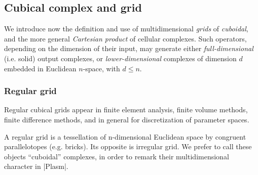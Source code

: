 \subsection{Cubical complex and grid}\label{sect:3-2-2}


We introduce now the definition and use of multidimensional \emph{grids} of \emph{cuboidal}, and the more general \emph{Cartesian product} of cellular complexes. Such operators, depending on the dimension of their input, may generate either \emph{full-dimensional} (i.e. solid) output complexes, or \emph{lower-dimensional} complexes of dimension $d$ embedded in Euclidean $n$-space, with $d\leq n$.  

\subsubsection*{Regular grid}


Regular cubical grids appear in finite element analysis, finite volume methods, finite difference methods, and in general for discretization of parameter spaces. 

\begin{definition} A regular grid is a tessellation of n-dimensional Euclidean space by congruent parallelotopes (e.g. bricks). Its opposite is irregular grid. We prefer to call these objects “cuboidal” complexes, in order to remark their multidimensional character in |Plasm|.
\end{definition}


